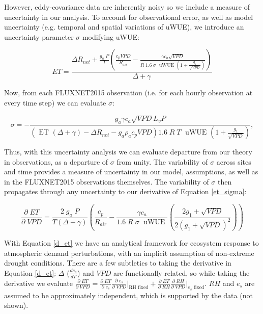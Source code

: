 \documentclass[draft,linenumbers]{agujournal}
\begin{document}
However, eddy-covariance data are inherently noisy so we include a measure of uncertainty in our analysis. To account for observational error, as well as model uncertainty (e.g. temporal and spatial variations of uWUE), we introduce an uncertainty parameter $\sigma$ modifying uWUE:

\begin{linenomath*}
  \begin{equation}
    ET = \frac{\Delta R_{net} + \frac{g_a\; P}{T} \left( \frac{ c_p VPD}{R_{air}} -  \frac{\gamma c_a \sqrt{VPD} }{ R \; 1.6\; \sigma \; \text{ uWUE } (1 + \frac{g_1}{\sqrt{VPD}})} \right) }{ \Delta + \gamma}
    \label{et_sigma}
  \end{equation}
\end{linenomath*}

Now, from each FLUXNET2015 observation (i.e. for each hourly observation at every time step) we can evaluate $\sigma$:

\begin{linenomath*}
  \begin{equation}
\sigma = - \frac{g_a \gamma c_a \sqrt{VPD} L_v P }{ \left(\text{ ET } ( \Delta + \gamma) - \Delta R_{net} - g_a \rho_a c_p VPD\right) 1.6 \; R\; T\; \text{ uWUE } (1 + \frac{g_1}{\sqrt{VPD}})},
    \label{sigma}
  \end{equation}
\end{linenomath*}

Thus, with this uncertainty analysis we can evaluate departure from our theory in observations, as a departure of $\sigma$ from unity. The variability of $\sigma$ across sites and time provides a measure of uncertainty in our model, assumptions, as well as in the FLUXNET2015 observations themselves. The variability of $\sigma$ then propagates through any uncertainty to our derivative of Equation \ref{et_sigma}:

\begin{linenomath*}
  \begin{equation}
    \frac{\partial \;  ET}{\partial \; VPD} = \frac{2\; g_a \; P}{T(\Delta + \gamma)}   \left(\frac{ c_p}{R_{air}} -  \frac{\gamma c_a }{1.6 \; R\; \sigma \; \text{ uWUE }} \left( \frac{2 g_1 + \sqrt{VPD}}{2 (g_1 + \sqrt{VPD})^2}\right) \right)
    \label{d_et}
  \end{equation}
\end{linenomath*}

With Equation \ref{d_et} we have an analytical framework for ecosystem response to atmospheric demand perturbations, with an implicit assumption of non-extreme drought conditions. There are a few subtleties to taking the derivative in Equation \ref{d_et}: $\Delta$ ($\frac{d e_{s}}{d T}$) and $VPD$ are functionally related, so while taking the derivative we evaluate $\frac{\partial \; ET}{\partial \; VPD} = \frac{\partial \; ET} {\partial \; e_s} \frac{\partial \; e_s}{\partial \; VPD} \Big|_{\text{RH fixed}} + \frac{\partial \; ET}{\partial \; RH} \frac{\partial \; RH}{\partial \; VPD} \Big|_{\text{$e_s$ fixed}}$. $RH$ and $e_s$ are assumed to be approximately independent, which is supported by the data (not shown). 
\end{document}
